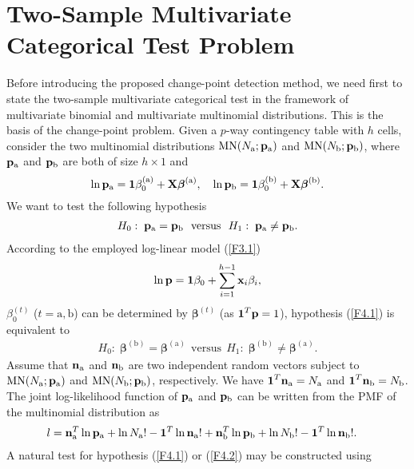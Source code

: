 \section{Two-Sample Multivariate Categorical Test Problem}\label{sec4.2}

Before introducing the proposed change-point detection method, we need first to
state the two-sample multivariate categorical test in the framework of multivariate
binomial and multivariate multinomial distributions. This is the basis of the
change-point problem. Given a $p$-way contingency table with $h$ cells, consider the
two multinomial distributions $\mbox{MN}(N_{\mathrm{a}};{\bf p}_{\mathrm{a}})$ and
$\mbox{MN}(N_{\mathrm{b}};{\bf p}_{\mathrm{b}})$, where ${\bf p}_{\mathrm{a}}$ and
${\bf p}_{\mathrm{b}}$ are both of size $h\times 1$ and
\[
\ln{\bf p}_{\mathrm{a}}=\boldsymbol 1\beta^{(\mathrm{a})}_0+{\bf
X}\boldsymbol\beta^{(\mathrm{a})},\quad \ln{\bf p}_{\mathrm{b}}=\boldsymbol
1\beta^{(\mathrm{b})}_0+{\bf X}\boldsymbol\beta^{(\mathrm{b})}.
\]
We want to test the following hypothesis
\begin{align}\label{F4.1}
H_0:\;{\bf p}_{\mathrm{a}}={\bf p}_{\mathrm{b}}\ \ \mbox{versus}\ \ H_1:\;{\bf
p}_{\mathrm{a}}\ne{\bf p}_{\mathrm{b}}.
\end{align}
According to the employed log-linear model (\ref{F3.1})
\[
\ln {\bf
p}=\boldsymbol{1}\beta_0+\sum_{i=1}^{h-1}{\bf x}_i\beta_i,
\]
$\beta^{(t)}_0$ ($t=\mathrm{a},\mathrm{b}$) can be determined by $\bm\beta^{(t)}$
(as $\boldsymbol 1^T{\bf p}=1$), hypothesis (\ref{F4.1}) is equivalent to
\begin{align}\label{F4.2}
H_0:\;\bm{\beta}^{(\mathrm{b})}=\bm{\beta}^{(\mathrm{a})}\ \ \mbox{versus}\ \
H_1:\;\bm{\beta}^{(\mathrm{b})}\ne\bm{\beta}^{(\mathrm{a})}.
\end{align}
Assume that ${\bf n}_{\mathrm{a}}$ and ${\bf n}_{\mathrm{b}}$ are two independent
random vectors subject to $\mbox{MN}(N_{\mathrm{a}};{\bf p}_{\mathrm{a}})$ and
$\mbox{MN}(N_{\mathrm{b}};{\bf p}_{\mathrm{b}})$, respectively. We have $\boldsymbol 1^T{\bf
n}_{\mathrm{a}}=N_{\mathrm{a}}$ and $\boldsymbol 1^T{\bf n}_{\mathrm{b}}=N_{\mathrm{b}}$.
The joint log-likelihood function of ${\bf p}_{\mathrm{a}}$ and ${\bf
p}_{\mathrm{b}}$ can be written from the PMF of the multinomial distribution as
\begin{align*}
l&={\bf n}_{\mathrm{a}}^T\ln{\bf p}_{\mathrm{a}}+\ln N_{\mathrm{a}}!-\boldsymbol 1^T\ln{\bf
n}_{\mathrm{a}}!+{\bf n}_{\mathrm{b}}^T\ln{\bf p}_{\mathrm{b}}+\ln
N_{\mathrm{b}}!-\boldsymbol 1^T\ln{\bf n}_{\mathrm{b}}!.
\end{align*}
A natural test for hypothesis (\ref{F4.1}) or (\ref{F4.2}) may be constructed using
